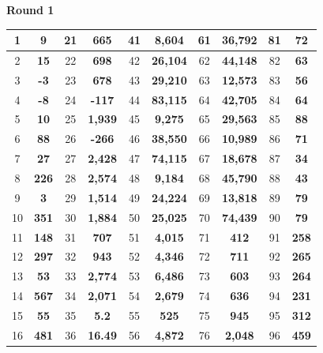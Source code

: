 \documentclass[11pt]{article}
\begin{document}
\thispagestyle{empty}
\begin{center}
\textbf{Round 1}
\end{center}
\begin{table}[h]
\centering
\begin{tabular}{|c|c||c|c||c|c||c|c||c|c|}
\hline
1 & \textbf{9} & 21 & \textbf{665} & 41 & \textbf{8,604} & 61 & \textbf{36,792} & 81 & \textbf{72} \\
\hline
2 & \textbf{15} & 22 & \textbf{698} & 42 & \textbf{26,104} & 62 & \textbf{44,148} & 82 & \textbf{63} \\
\hline
3 & \textbf{-3}& 23 & \textbf{678} & 43 & \textbf{29,210} & 63 & \textbf{12,573} & 83 & \textbf{56} \\
\hline
4 & \textbf{-8} & 24 & \textbf{-117} & 44 & \textbf{83,115} & 64 & \textbf{42,705} & 84 & \textbf{64} \\
\hline
5 & \textbf{10}& 25 & \textbf{1,939} & 45 & \textbf{9,275} & 65 & \textbf{29,563} & 85 & \textbf{88} \\
\hline
6 & \textbf{88} & 26 & \textbf{-266} & 46 & \textbf{38,550} & 66 & \textbf{10,989} & 86 & \textbf{71} \\
\hline
7 & \textbf{27}& 27 & \textbf{2,428} & 47 & \textbf{74,115} & 67 & \textbf{18,678} & 87 & \textbf{34} \\
\hline
8 & \textbf{226}& 28 & \textbf{2,574} & 48 & \textbf{9,184} & 68 & \textbf{45,790} & 88 & \textbf{43} \\
\hline
9 & \textbf{3}& 29 & \textbf{1,514} & 49 & \textbf{24,224} & 69 & \textbf{13,818} & 89 & \textbf{79} \\
\hline
10 & \textbf{351}& 30 & \textbf{1,884} & 50 & \textbf{25,025} & 70 & \textbf{74,439} & 90 & \textbf{79} \\
\hline
11 & \textbf{148} & 31 & \textbf{707} & 51 & \textbf{4,015} & 71 & \textbf{412} & 91 & \textbf{258} \\
\hline
12 & \textbf{297}& 32 & \textbf{943} & 52 & \textbf{4,346} & 72 & \textbf{711} & 92 & \textbf{265} \\
\hline
13 & \textbf{53} & 33 & \textbf{2,774} & 53 & \textbf{6,486} & 73 & \textbf{603} & 93 & \textbf{264} \\
\hline
14 & \textbf{567} & 34 & \textbf{2,071}& 54 & \textbf{2,679} & 74 & \textbf{636} & 94 & \textbf{231} \\
\hline
15 & \textbf{55} & 35 & \textbf{5.2} & 55 & \textbf{525} & 75 & \textbf{945} & 95 & \textbf{312} \\
\hline
16 & \textbf{481} & 36 & \textbf{16.49} & 56 & \textbf{4,872} & 76 & \textbf{2,048} & 96 & \textbf{459} \\

\end{tabular}
\end{table}
\end{document}
